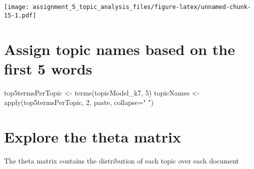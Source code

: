 \documentclass[
]{article}
\newenvironment{Shaded}{\begin{snugshade}}{\end{snugshade}}
\newcommand{\AttributeTok}[1]{\textcolor[rgb]{0.77,0.63,0.00}{#1}}
\newcommand{\DecValTok}[1]{\textcolor[rgb]{0.00,0.00,0.81}{#1}}
\newcommand{\FunctionTok}[1]{\textcolor[rgb]{0.00,0.00,0.00}{#1}}
\newcommand{\NormalTok}[1]{#1}
\newcommand{\OtherTok}[1]{\textcolor[rgb]{0.56,0.35,0.01}{#1}}
\newcommand{\StringTok}[1]{\textcolor[rgb]{0.31,0.60,0.02}{#1}}
\begin{document}
\texttt{[image: assignment\_5\_topic\_analysis\_files/figure-latex/unnamed-chunk-15-1.pdf]}

\hypertarget{assign-topic-names-based-on-the-first-5-words}{%
\section{Assign topic names based on the first 5
words}\label{assign-topic-names-based-on-the-first-5-words}}

\begin{Shaded}
\begin{Highlighting}[]
\NormalTok{top5termsPerTopic }\OtherTok{\textless{}{-}} \FunctionTok{terms}\NormalTok{(topicModel\_k7, }\DecValTok{5}\NormalTok{)}
\NormalTok{topicNames }\OtherTok{\textless{}{-}} \FunctionTok{apply}\NormalTok{(top5termsPerTopic, }\DecValTok{2}\NormalTok{, paste, }\AttributeTok{collapse=}\StringTok{" "}\NormalTok{)}
\end{Highlighting}
\end{Shaded}

\hypertarget{explore-the-theta-matrix}{%
\section{Explore the theta matrix}\label{explore-the-theta-matrix}}

The theta matrix contains the distribution of each topic over each
document
\end{document}
